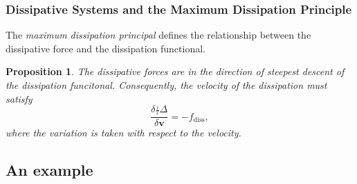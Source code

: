 \documentclass[final,10pt]{article}
\newtheorem{proposition}{Proposition}
\begin{document}
\subsubsection{Dissipative Systems and the Maximum Dissipation Principle}
The \emph{maximum dissipation principal} defines the relationship between the dissipative force and the dissipation functional.
\begin{proposition}\label{Maximimum Dissipation Principle}
The dissipative forces are in the direction of steepest descent of the dissipation funcitonal.
Consequently, the velocity of the dissipation must satisfy
\begin{equation} \label{diss principle}
	\frac{\delta \frac{_1}{^2}\Delta}{\delta \bm v} = -f_\mathrm{diss},
\end{equation}
where the variation is taken with respect to the velocity.
\end{proposition}














\subsection{An example}
\end{document}
